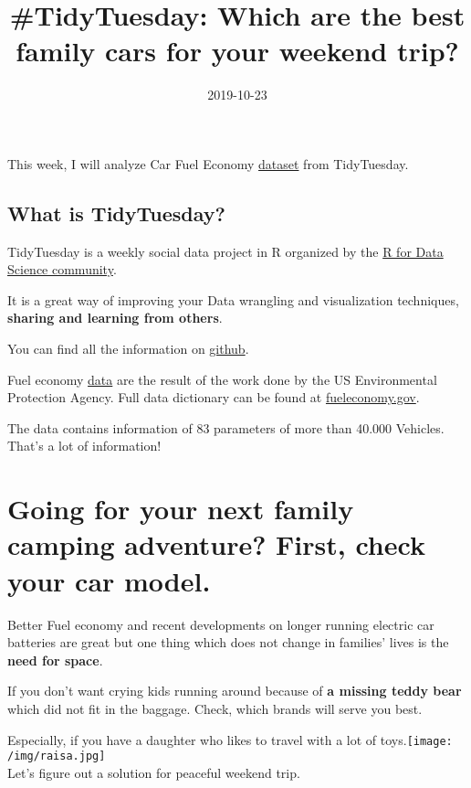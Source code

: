 \documentclass[]{article}
\title{\#TidyTuesday: Which are the best family cars for your weekend trip?}
\author{}
\date{2019-10-23}
\begin{document}
\maketitle

This week, I will analyze Car Fuel Economy
\href{https://github.com/rfordatascience/tidytuesday/tree/master/data/2019/2019-10-15}{dataset}
from TidyTuesday.

\hypertarget{what-is-tidytuesday}{%
\subsection{What is TidyTuesday?}\label{what-is-tidytuesday}}

TidyTuesday is a weekly social data project in R organized by the
\href{https://thomasmock.netlify.com/post/tidytuesday-a-weekly-social-data-project-in-r/}{R
for Data Science community}.

It is a great way of improving your Data wrangling and visualization
techniques, \textbf{sharing and learning from others}.

You can find all the information on
\href{https://github.com/rfordatascience/tidytuesday}{github}.

Fuel economy \href{https://www.fueleconomy.gov/feg/download.shtml}{data}
are the result of the work done by the US Environmental Protection
Agency. Full data dictionary can be found at
\href{https://www.fueleconomy.gov/feg/ws/index.shtml\#fuelType1}{fueleconomy.gov}.

The data contains information of 83 parameters of more than 40.000
Vehicles. That's a lot of information!

\hypertarget{going-for-your-next-family-camping-adventure-first-check-your-car-model.}{%
\section{Going for your next family camping adventure? First, check your
car
model.}\label{going-for-your-next-family-camping-adventure-first-check-your-car-model.}}

Better Fuel economy and recent developments on longer running electric
car batteries are great but one thing which does not change in families'
lives is the \textbf{need for space}.

If you don't want crying kids running around because of \textbf{a
missing teddy bear} which did not fit in the baggage. Check, which
brands will serve you best.

Especially, if you have a daughter who likes to travel with a lot of
toys.\texttt{[image: /img/raisa.jpg]}\\
Let's figure out a solution for peaceful weekend trip.
\end{document}
